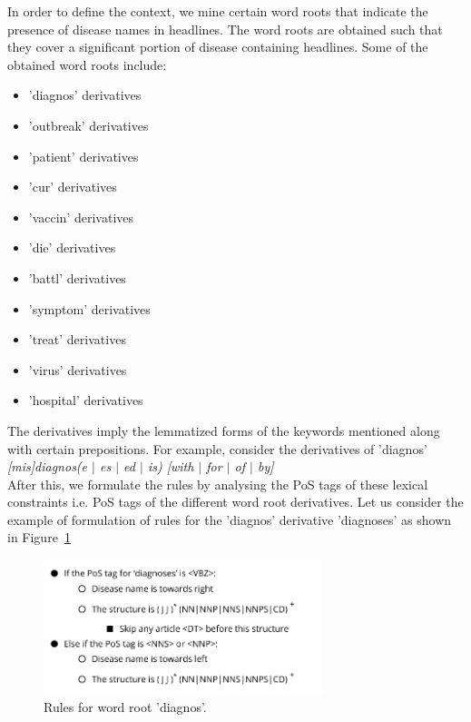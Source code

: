 \documentclass{article}
\begin{document}
In order to define the context, we mine certain word roots that indicate the presence of disease names in headlines. The word roots are obtained such that they cover a significant portion of disease containing headlines. Some of the obtained word roots include: 

\begin{itemize}
\item 'diagnos' derivatives

\item 'outbreak' derivatives

\item 'patient' derivatives

\item 'cur' derivatives

\item 'vaccin' derivatives

\item 'die' derivatives

\item 'battl' derivatives

\item 'symptom' derivatives

\item 'treat' derivatives

\item 'virus' derivatives

\item 'hospital' derivatives

\end{itemize}
The derivatives imply the lemmatized forms of the keywords mentioned along with
certain prepositions. For example, consider the derivatives of 'diagnos'\\

\textit{[mis]diagnos(e  $|$ es $|$ ed $|$ is) [with $|$ for $|$ of  $|$ by]}\\ 

After this, we formulate the rules by analysing the PoS tags of these lexical constraints i.e. PoS tags of the
different word root derivatives. Let us consider the example of formulation of rules for the
'diagnos' derivative 'diagnoses' as shown in Figure~\ref{fig:rules}


\begin{figure}[h]
\centering
\includegraphics[width=3.2in]{img/rules.png}
\caption{Rules for word root 'diagnos'.}
\label{fig:rules}
\end{figure}
\end{document}
